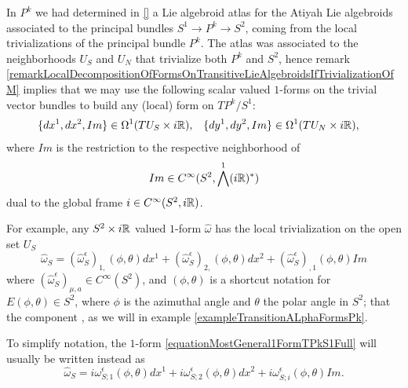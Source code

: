 \begin{example}[$TP^k/S^1$ over $S^2$]\label{exampleFormsTPkBuildingBLocksandMostGeneral1FormOn}
In $P^k$ we had determined in \ref{} a Lie algebroid atlas for the Atiyah Lie algebroids associated to the principal bundles $S^1 \to P^k \to S^2$, coming from the local trivializations of the principal bundle $P^k$. The atlas was associated to the neighborhoods $U_S$ and $U_N$ that trivialize both $P^k$ and $S^2$, hence remark \ref{remarkLocalDecompositionOfFormsOnTransitiveLieAlgebroidsIfTrivializationOfM} implies that we may use the following scalar valued $1$-forms on the trivial vector bundles to build any (local) form on $TP^k/S^1$:
\begin{align}
    \{dx^1, dx^2, Im\} &\in \Omega^1(TU_S \times i\mathbb{R}), &
    \{dy^1, dy^2, Im\} &\in \Omega^1(TU_N \times i\mathbb{R}),
\end{align}
where $Im$ is the restriction to the respective neighborhood of 
\begin{equation}\label{equationDefinitionImS2TPkAsForm}
    Im \in C^\infty(S^2, \bigwedge^1 (i\mathbb{R})^*)
\end{equation} 
dual to the global frame $i \in C^\infty(S^2, i\mathbb{R})$.

For example, any $S^2 \times i\mathbb{R}$ valued $1$-form $\hat \omega$ has the local trivialization on the open set $U_S$
\begin{equation}\label{equationMostGeneral1FormTPkS1Full}
    \hat \omega_S = (\hat \omega^\epsilon_{S})_{1,}(\phi, \theta) dx^1 + (\hat \omega^\epsilon_{S})_{2,}(\phi, \theta) dx^2 + (\hat \omega^\epsilon_{S})_{,1}(\phi, \theta) Im
\end{equation}
where $(\hat \omega^{\epsilon}_{S})_{\mu,  a} \in C^\infty(S^2)$, and $(\phi, \theta)$ is a shortcut notation for $E(\phi, \theta) \in S^2$, where $\phi$ is the azimuthal angle and $\theta$ the polar angle in $S^2$; that the component , as we will in example \ref{exampleTransitionALphaFormsPk}.

To simplify notation, the $1$-form \eqref{equationMostGeneral1FormTPkS1Full} will usually be written instead as
\begin{equation}\label{equationMostGeneral1FormTPkS1Simplified}
    \hat \omega_S = i\omega^\epsilon_{S; 1}(\phi, \theta) dx^1 + i\omega^\epsilon_{S; 2}(\phi, \theta) dx^2 + i\omega^\epsilon_{S; i}(\phi, \theta) Im.
\end{equation}


\end{example}
